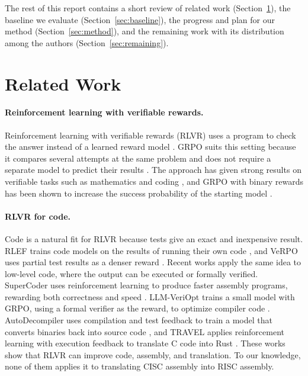 \documentclass{article}
\begin{document}
The rest of this report contains a short review of related work (Section~\ref{sec:related}), the baseline we evaluate (Section~\ref{sec:baseline}), the progress and plan for our method (Section~\ref{sec:method}), and the remaining work with its distribution among the authors (Section~\ref{sec:remaining}).

\section{Related Work}
\label{sec:related}

\paragraph{Reinforcement learning with verifiable rewards.}
Reinforcement learning with verifiable rewards (RLVR) uses a program to check the answer instead of a learned reward model \citep{tulu3}. GRPO suits this setting because it compares several attempts at the same problem and does not require a separate model to predict their results \citep{deepseekmath}. The approach has given strong results on verifiable tasks such as mathematics and coding \citep{deepseekr1}, and GRPO with binary rewards has been shown to increase the success probability of the starting model \citep{mroueh2025grpo}.

\paragraph{RLVR for code.}
Code is a natural fit for RLVR because tests give an exact and inexpensive result. RLEF trains code models on the results of running their own code \citep{rlef}, and VeRPO uses partial test results as a denser reward \citep{verpo}. Recent works apply the same idea to low-level code, where the output can be executed or formally verified. SuperCoder uses reinforcement learning to produce faster assembly programs, rewarding both correctness and speed \citep{supercoder}. LLM-VeriOpt trains a small model with GRPO, using a formal verifier as the reward, to optimize compiler code \citep{veriopt}. AutoDecompiler uses compilation and test feedback to train a model that converts binaries back into source code \citep{autodecompiler}, and TRAVEL applies reinforcement learning with execution feedback to translate C code into Rust \citep{travel}. These works show that RLVR can improve code, assembly, and translation. To our knowledge, none of them applies it to translating CISC assembly into RISC assembly.
\end{document}

